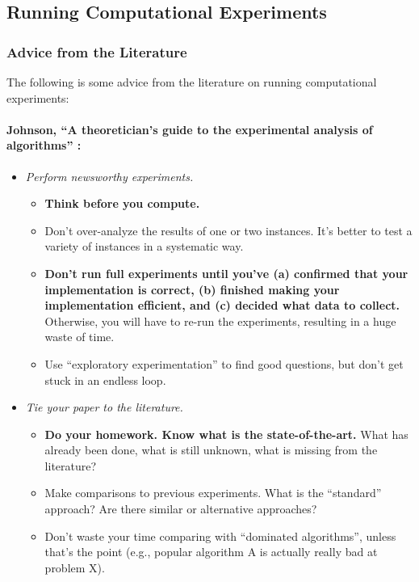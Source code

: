 \documentclass[12pt]{article}
\begin{document}
\subsection{Running Computational Experiments}
\subsubsection{Advice from the Literature}
The following is some advice from the literature on running computational experiments:
\paragraph{Johnson, ``A theoretician's guide to the experimental analysis of algorithms'' \cite{johnson2002theoretician}:}
\begin{itemize}
    \item \emph{Perform newsworthy experiments.}
        \begin{itemize}
            \item \textbf{Think before you compute.}
            \item Don't over-analyze the results of one or two instances. It's better to test a variety of instances in a systematic way.
            \item \textbf{Don't run full experiments until you've (a) confirmed that your implementation is correct, (b) finished making your implementation efficient, and (c) decided what data to collect.} Otherwise, you will have to re-run the experiments, resulting in a huge waste of time.
            \item Use ``exploratory experimentation'' to find good questions, but don't get stuck in an endless loop.
        \end{itemize}
    \item \emph{Tie your paper to the literature.}
        \begin{itemize}
            \item \textbf{Do your homework. Know what is the state-of-the-art.} What has already been done, what is still unknown, what is missing from the literature?
            \item Make comparisons to previous experiments. What is the ``standard'' approach? Are there similar or alternative approaches?
            \item Don't waste your time comparing with ``dominated algorithms'', unless that's the point (e.g., popular algorithm A is actually really bad at problem X).
        \end{itemize}

\end{itemize}
\end{document}
